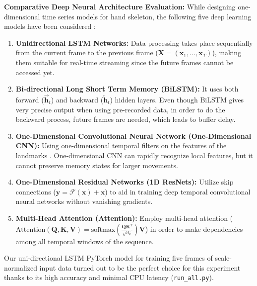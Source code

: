 \textbf{Comparative Deep Neural Architecture Evaluation:} 
While designing one-dimensional time series models for hand skeleton, the following five deep learning models have been considered \cite{Lai2018CNN, Ikram2020Skeleton, Nunez2018Convolutional, Doan2022Efficient, Gammulle2021TMMF}:
\begin{enumerate}
    \item \textbf{Unidirectional LSTM Networks:} Data processing takes place sequentially from the current frame to the previous frame ($\mathbf{X} = (\mathbf{x}_1, \dots, \mathbf{x}_T)$), making them suitable for real-time streaming since the future frames cannot be accessed yet.
    \item \textbf{Bi-directional Long Short Term Memory (BiLSTM):} It uses both forward ($\overrightarrow{\mathbf{h}}_t$) and backward ($\overleftarrow{\mathbf{h}}_t$) hidden layers. Even though BiLSTM gives very precise output when using pre-recorded data, in order to do the backward process, future frames are needed, which leads to buffer delay.
    \item \textbf{One-Dimensional Convolutional Neural Network (One-Dimensional CNN):} Using one-dimensional temporal filters on the features of the landmarks \cite{Lai2018CNN, Ikram2020Skeleton}. One-dimensional CNN can rapidly recognize local features, but it cannot preserve memory states for larger movements.
    \item \textbf{One-Dimensional Residual Networks (1D ResNets):} Utilize skip connections ($\mathbf{y} = \mathcal{F}(\mathbf{x}) + \mathbf{x}$) to aid in training deep temporal convolutional neural networks without vanishing gradients.
    \item \textbf{Multi-Head Attention (Attention):} Employ multi-head attention ($\text{Attention}(\mathbf{Q}, \mathbf{K}, \mathbf{V}) = \text{softmax}\left(\frac{\mathbf{Q} \mathbf{K}^T}{\sqrt{d_k}}\right) \mathbf{V}$) in order to make dependencies among all temporal windows of the sequence.
\end{enumerate}

Our uni-directional LSTM PyTorch model for training five frames of scale-normalized input data turned out to be the perfect choice for this experiment thanks to its high accuracy and minimal CPU latency (\texttt{run\_all.py}).



